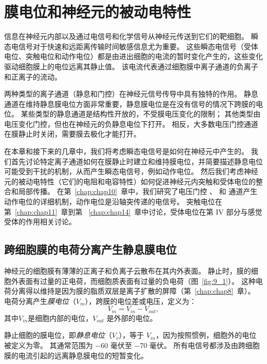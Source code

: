 \chapter{膜电位和神经元的被动电特性} \label{chap:chap9}

信息在神经元内部以及通过电信号和化学信号从神经元传送到它们的靶细胞。
瞬态电信号对于快速和远距离传输时间敏感信息尤为重要。
这些瞬态电信号（受体电位、突触电位和动作电位）都是由进出细胞的电流的暂时变化产生的，这些变化驱动细胞膜上的电位远离其静止值。
该电流代表通过细胞膜中离子通道的负离子和正离子的流动。


两种类型的离子通道（静息和门控）在神经元信号传导中具有独特的作用。
静息通道在维持静息膜电位方面非常重要，静息膜电位是在没有信号的情况下跨膜的电位。
某些类型的静息通道是结构性开放的，不受膜电压变化的限制；
其他类型由电压变化门控，但也在神经元的负静息电位下打开。
相反，大多数电压门控通道在膜静止时关闭，需要膜去极化才能打开。


在本章和接下来的几章中，我们将考虑瞬态电信号是如何在神经元中产生的。
我们首先讨论特定离子通道如何在膜静止时建立和维持膜电位，并简要描述静息电位可能受到干扰的机制，从而产生瞬态电信号，例如动作电位。
然后我们考虑神经元的被动电特性（它们的电阻和电容特性）如何促进神经元内突触和受体电位的整合和局部传播。
在第~\ref{chap:chap10}~章中，我们研究了电压门控 、 和  通道产生动作电位的详细机制，动作电位是沿轴突传递的电信号。
突触电位在第~\ref{chap:chap11}~章到第 ~\ref{chap:chap14}~章中讨论，受体电位在第 IV 部分与感觉受体的作用相关讨论。



\section{跨细胞膜的电荷分离产生静息膜电位}

神经元的细胞膜有薄薄的正离子和负离子云散布在其内外表面。
静止时，膜的细胞外表面有过量的正电荷，而细胞质表面有过量的负电荷（图~\ref{fig:9_1}）。
这种电荷分离得以维持是因为膜的脂质双层是离子扩散的屏障（第~\ref{chap:chap8}~章）。
电荷分离产生\textit{膜电位}（$ V_m $），跨膜的电位差或电压，定义为：
\begin{equation}
	V_m = V_{in} - V_{out},
\end{equation}
其中$ V_{in} $是细胞内部的电位，$ V_{out} $ 是外部的电位。


静止细胞的膜电位，即\textit{静息电位}（$ V_r $），等于 $V_{in}$，因为按照惯例，细胞外的电位被定义为零。
其通常范围为 −60 毫伏至 −70 毫伏。
所有电信号都涉及由跨细胞膜的电流引起的远离静息膜电位的短暂变化。


